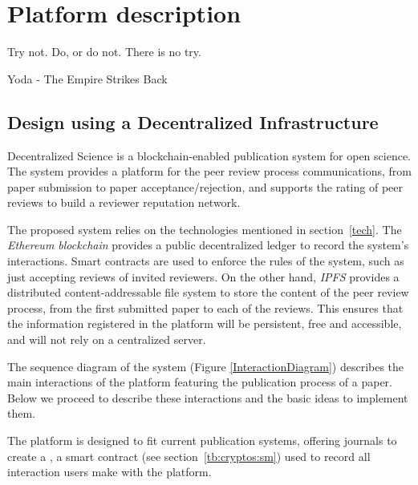 \chapter{Platform description}
\label{cha:platform-description}
\begin{FraseCelebre}
  \begin{Frase}
    Try not. Do, or do not. There is no try.
  \end{Frase}
  \begin{Fuente}
    Yoda - The Empire Strikes Back
  \end{Fuente}
\end{FraseCelebre}
\section{Design using a Decentralized Infrastructure}
\label{archAndDes}
Decentralized Science is a blockchain-enabled publication system for open
science. The system provides a platform for the peer review process
communications, from paper submission to paper acceptance/rejection, and
supports the rating of peer reviews to build a reviewer reputation network.

The proposed system relies on the technologies mentioned in section~\ref{tech}.
The \emph{Ethereum blockchain} provides a public decentralized ledger to record
the system's interactions. Smart contracts are used to enforce the rules of the
system, such as just accepting reviews of invited reviewers. On the other hand,
\emph{IPFS} provides a distributed content-addressable file system to store the
content of the peer review process, from the first submitted paper to each of
the reviews. This ensures that the information registered in the platform will
be persistent, free and accessible, and will not rely on a centralized server.


The sequence diagram of the system (Figure \ref{InteractionDiagram}) describes
the main interactions of the platform featuring the publication process of a
paper. Below we proceed to describe these interactions and the basic ideas to
implement them.


\label{cha:platform-description-6}

The platform is designed to fit current publication systems, offering journals
to create a , a smart contract (see
section~\ref{tb:cryptos:sm}) used to record all interaction users make with the
platform.

